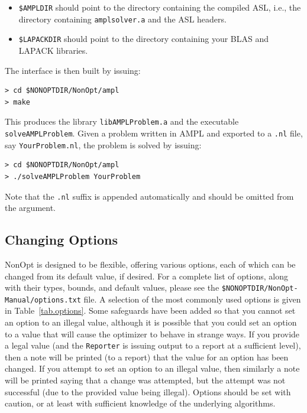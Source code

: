 \documentclass{article}
\begin{document}
\begin{itemize}
  \item \texttt{\$AMPLDIR} should point to the directory containing the compiled ASL, i.e., the directory containing \texttt{amplsolver.a} and the ASL headers.
  \item \texttt{\$LAPACKDIR} should point to the directory containing your BLAS and LAPACK libraries.
\end{itemize}

The interface is then built by issuing:

\begin{verbatim}
> cd $NONOPTDIR/NonOpt/ampl
> make
\end{verbatim}

This produces the library \texttt{libAMPLProblem.a} and the executable \texttt{solveAMPLProblem}.  Given a problem written in AMPL and exported to a \texttt{.nl} file, say \texttt{YourProblem.nl}, the problem is solved by issuing:

\begin{verbatim}
> cd $NONOPTDIR/NonOpt/ampl
> ./solveAMPLProblem YourProblem
\end{verbatim}

Note that the \texttt{.nl} suffix is appended automatically and should be omitted from the argument.

\subsection{Changing Options}\label{sec.options}

NonOpt is designed to be flexible, offering various options, each of which can be changed from its default value, if desired.  For a complete list of options, along with their types, bounds, and default values, please see the \texttt{\$NONOPTDIR/NonOpt-Manual/options.txt} file.  A selection of the most commonly used options is given in Table~\ref{tab.options}.  Some safeguards have been added so that you cannot set an option to an illegal value, although it is possible that you could set an option to a value that will cause the optimizer to behave in strange ways.  If you provide a legal value (and the \texttt{Reporter} is issuing output to a report at a sufficient level), then a note will be printed (to a report) that the value for an option has been changed.  If you attempt to set an option to an illegal value, then similarly a note will be printed saying that a change was attempted, but the attempt was not successful (due to the provided value being illegal).  Options should be set with caution, or at least with sufficient knowledge of the underlying algorithms.
\end{document}
